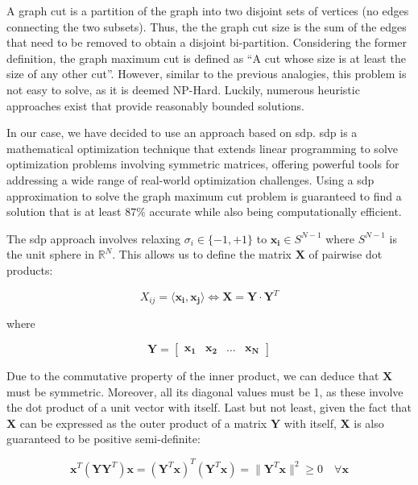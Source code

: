 \documentclass[../main.tex]{subfiles}
\begin{document}
A graph cut is a partition of the graph into two disjoint sets of vertices (no edges connecting the two subsets). Thus, the the graph cut size is the sum of the edges that need to be removed to obtain a disjoint bi-partition. Considering the former definition, the graph maximum cut is defined as ``A cut whose size is at least the size of any other cut''\cite{sudakov2005}. However, similar to the previous analogies, this problem is not easy to solve, as it is deemed NP-Hard\cite{chan2014}. Luckily, numerous heuristic approaches exist that provide reasonably bounded solutions.

In our case, we have decided to use an approach based on \gls{sdp}. \Gls{sdp} is a mathematical optimization technique that extends linear programming to solve optimization problems involving symmetric matrices, offering powerful tools for addressing a wide range of real-world optimization challenges. Using a \gls{sdp} approximation to solve the graph maximum cut problem is guaranteed to find a solution that is at least $87 \si{\percent}$ accurate while also being computationally efficient\cite{kemal2008}.

The \gls{sdp} approach involves relaxing $\sigma_i \in \{-1, +1\}$ to $\bm{x_i} \in S^{N-1}$ where $S^{N-1}$ is the unit sphere in $\mathbb{R}^N$. This allows us to define the matrix $\bm{X}$ of pairwise dot products:

\begin{equation}
    X_{ij} = \langle \bm{x_i}, \bm{x_j} \rangle \Leftrightarrow \bm{X} = \bm{Y} \cdot \bm{Y}^T
\end{equation}

where

\begin{equation}
    \bm{Y} =
    \begin{bmatrix}
        \bm{x_1} & \bm{x_2} & \dots & \bm{x_N}
    \end{bmatrix}
\end{equation}

Due to the commutative property of the inner product, we can deduce that $\bm{X}$ must be symmetric. Moreover, all its diagonal values must be 1, as these involve the dot product of a unit vector with itself. Last but not least, given the fact that $\bm{X}$ can be expressed as the outer product of a matrix $\bm{Y}$ with itself, $\bm{X}$ is also guaranteed to be positive semi-definite: 

\begin{equation}
    \bm{x}^T (\bm{Y} \bm{Y}^T) \bm{x} = (\bm{Y}^T \bm{x})^T (\bm{Y}^T \bm{x}) = \lVert \bm{Y}^T \bm{x} \rVert^2 \geq 0 \quad \forall \bm{x}
\end{equation}
\end{document}
